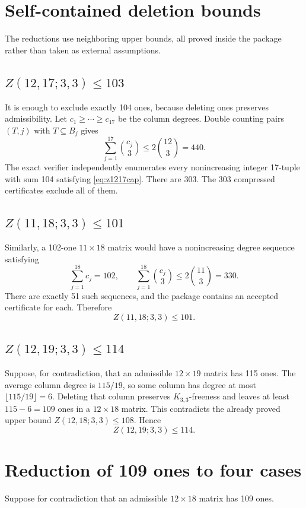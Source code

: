 \documentclass[11pt]{article}
\begin{document}
\section{Self-contained deletion bounds}
The reductions use neighboring upper bounds, all proved inside the package rather than taken as external assumptions.

\subsection{$Z(12,17;3,3)\le103$}
It is enough to exclude exactly 104 ones, because deleting ones preserves admissibility. Let $c_1\ge\cdots\ge c_{17}$ be the column degrees. Double counting pairs $(T,j)$ with $T\subseteq B_j$ gives
\begin{equation}
\sum_{j=1}^{17}\binom{c_j}3\le2\binom{12}3=440.
\label{eq:z1217cap}
\end{equation}
The exact verifier independently enumerates every nonincreasing integer 17-tuple with sum 104 satisfying \eqref{eq:z1217cap}. There are 303. The 303 compressed certificates exclude all of them.

\subsection{$Z(11,18;3,3)\le101$}
Similarly, a 102-one $11\times18$ matrix would have a nonincreasing degree sequence satisfying
\[
\sum_{j=1}^{18}c_j=102,
\qquad
\sum_{j=1}^{18}\binom{c_j}3\le2\binom{11}3=330.
\]
There are exactly 51 such sequences, and the package contains an accepted certificate for each. Therefore
\begin{equation}
Z(11,18;3,3)\le101.
\label{eq:z1118}
\end{equation}

\subsection{$Z(12,19;3,3)\le114$}
Suppose, for contradiction, that an admissible $12\times19$ matrix has
115 ones. The average column degree is $115/19$, so some column has degree at
most $\lfloor115/19\rfloor=6$. Deleting that column preserves
$K_{3,3}$-freeness and leaves at least $115-6=109$ ones in a
$12\times18$ matrix. This contradicts the already proved upper bound
$Z(12,18;3,3)\le108$. Hence
\begin{equation}
Z(12,19;3,3)\le114.
\label{eq:z1219}
\end{equation}

\section{Reduction of 109 ones to four cases}
Suppose for contradiction that an admissible $12\times18$ matrix has 109 ones.
\end{document}
